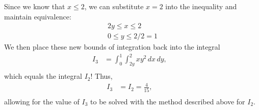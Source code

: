 \documentclass[12pt]{article}
\begin{document}
\begin{enumerate}[label=(\alph*)]
    Since we know that \(x \leq 2\), we can substitute \(x = 2\) into the inequality and maintain equivalence:
    \begin{align*}
         & 2y \leq x \leq 2 &\\
         & 0 \leq y \leq 2/2 = 1
    \end{align*}
    We then place these new bounds of integration back into the integral
    \begin{align*}
        I_{3} & = \int_{0}^{1} { \int_{2y}^{2} {x y^{2}} \,d x} \,d y , &\\
    \end{align*}
    which equals the integral \(I_{2}\)! Thus,
    \begin{align*}
        I_{3} & =  I_{2} = \frac{4}{15} ,&\\
    \end{align*}
    allowing for the value of \(I_{3}\) to be solved with the method described above for \(I_{2}\).


\end{enumerate}
\end{document}
